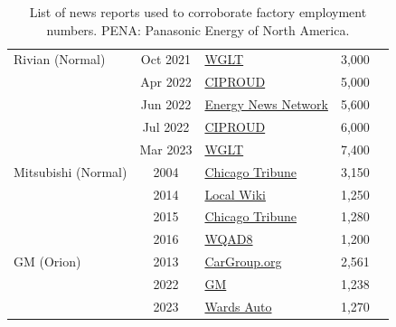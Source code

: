 \documentclass[sn-mathphys,Numbered]{sn-jnl}%
\begin{document}
\begin{appendices}
\begin{table}[ht]
\begin{tabular}{lclcc}
         \midrule
         Rivian (Normal) & Oct 2021 & \href{https://www.wglt.org/local-news/2021-10-11/rivian-tops-3-000-workers-at-plant-in-normal}{WGLT} & 3,000 \\
         & Apr 2022 & \href{https://www.centralillinoisproud.com/news/local-news/report-rivian-reportedly-planning-layoffs/}{CIPROUD} & 5,000 \\
         & Jun 2022 & \href{https://energynews.us/2022/06/06/a-decade-after-evtown-rivian-is-making-an-illinois-citys-electric-vehicle-vision-a-reality/}{Energy News Network} & 5,600 \\
         & Jul 2022 & \href{https://www.centralillinoisproud.com/news/local-news/report-rivian-reportedly-planning-layoffs/}{CIPROUD} & 6,000 \\
         & Mar 2023 & \href{https://www.wglt.org/local-news/2023-03-16/rivian-growth-boosts-bloomington-normal-jobs-numbers}{WGLT} & 7,400 \\
         \midrule
         Mitsubishi (Normal) & 2004 & \href{https://www.chicagotribune.com/business/ct-mitsubishi-normal-0725-biz-20150724-story.html}{Chicago Tribune} & 3,150 \\ 
         & 2014 & \href{https://localwiki.org/bloomington-normal/Mitsubishi}{Local Wiki} & 1,250 \\
         & 2015 & \href{https://www.chicagotribune.com/business/ct-mitsubishi-normal-0725-biz-20150724-story.html}{Chicago Tribune} & 1,280 \\
         & 2016 & \href{https://www.wqad.com/article/news/local/drone/8-in-the-air/mitsubishi-motors-in-illinois-is-officially-closed/526-efeb1f03-c794-42ba-8128-596954a229da}{WQAD8} & 1,200 \\
         \midrule
         GM (Orion) & 2013 & \href{https://www.cargroup.org/wp-content/uploads/2017/02/Economic-Contribution-of-General-Motors-Orion-Assembly-Pontiac-Metal-Stamping-and-Spring-Hill-Assembly-Manufacturing-Plant.pdf}{CarGroup.org} & 2,561 \\
         & 2022 & \href{https://www.gm.com/company/facilities/orion}{GM} & 1,238 \\
         & 2023 & \href{https://www.wardsauto.com/industry-news/gm-path-electric-future-leads-through-detroit-area-plant}{Wards Auto} & 1,270 \\
         \bottomrule
    \end{tabular}
    \caption{List of news reports used to corroborate factory employment numbers. PENA: Panasonic Energy of North America.}
    \label{tab:news-reports}
\end{table}


\end{appendices}
\end{document}
